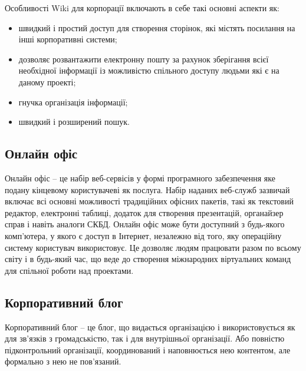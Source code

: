 \par Особливості Wiki для корпорації включають в себе такі основні аспекти як:
\begin{itemize}
\item швидкий і простий доступ для створення сторінок, які містять посилання на інші корпоративні системи;
\item дозволяє розвантажити електронну пошту за рахунок зберігання всієї необхідної інформації із можливістю спільного доступу людьми які є на даному проекті;
\item гнучка організація інформації;
\item швидкий і розширений пошук.
\end{itemize}



\subsection{Онлайн офіс}
Онлайн офіс -- це набір веб-сервісів у формі програмного забезпечення яке подану кінцевому користувачеві як послуга. 
Набір наданих веб-служб зазвичай включає всі основні можливості традиційних офісних пакетів, такі як текстовий редактор, електронні таблиці, додаток для створення презентацій, органайзер справ і навіть аналоги СКБД. 
Онлайн офіс може бути доступний з будь-якого комп'ютера, у якого є доступ в Інтернет, незалежно від того, яку операційну систему користувач використовує. 
Це дозволяє людям працювати разом по всьому світу і в будь-який час, що веде до створення міжнародних віртуальних команд для спільної роботи над проектами. 


\subsection{Корпоративний блог}
Корпоративний блог -- це блог, що видається організацією і використовується як для зв'язків з громадськістю, так і для внутрішньої організації. 
Або повністю підконтрольний організації, координований і наповнюється нею контентом, але формально з нею не пов'язаний.



